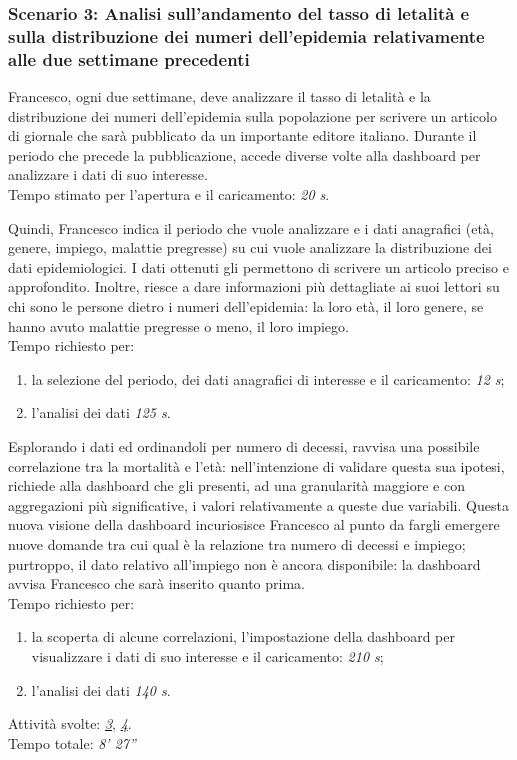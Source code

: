 \subsubsection*{Scenario 3: Analisi sull'andamento del tasso di letalità e sulla distribuzione dei numeri dell'epidemia relativamente alle due settimane precedenti}
Francesco, ogni due settimane, deve analizzare il tasso di letalità e la distribuzione dei numeri dell’epidemia sulla popolazione per scrivere un articolo di giornale che sarà pubblicato da un importante editore italiano. Durante il periodo che precede la pubblicazione, accede diverse volte alla dashboard per analizzare i dati di suo interesse.\\
Tempo stimato per l'apertura e il caricamento: \textit{20 s}. 

Quindi, Francesco indica il periodo che vuole analizzare e i dati anagrafici (età, genere, impiego, malattie pregresse) su cui vuole analizzare la distribuzione dei dati epidemiologici.
I dati ottenuti gli permettono di scrivere un articolo preciso e approfondito. Inoltre, riesce a dare informazioni più dettagliate ai suoi lettori su chi sono le persone dietro i numeri dell'epidemia: la loro età, il loro genere, se hanno avuto malattie pregresse o meno, il loro impiego.\\
Tempo richiesto per:
\begin{enumerate}
    \item la selezione del periodo, dei dati anagrafici di interesse e il caricamento: \textit{12 s};
    \item l'analisi dei dati \textit{125 s}.
\end{enumerate}

Esplorando i dati ed ordinandoli per numero di decessi, ravvisa una possibile correlazione tra la mortalità e l'età: nell'intenzione di validare questa sua ipotesi, richiede alla dashboard che gli presenti, ad una granularità maggiore e con aggregazioni più significative, i valori relativamente a queste due variabili. 
Questa nuova visione della dashboard incuriosisce Francesco al punto da fargli emergere nuove domande tra cui qual è la relazione tra numero di decessi e impiego; purtroppo, il dato relativo all'impiego non è ancora disponibile: la dashboard avvisa Francesco che sarà inserito quanto prima.\\
Tempo richiesto per:
\begin{enumerate}
    \item la scoperta di alcune correlazioni, l'impostazione della dashboard per visualizzare i dati di suo interesse e il caricamento: \textit{210 s};
    \item l'analisi dei dati \textit{140 s}.
\end{enumerate}
\noindent
Attività svolte: \hyperref[itm:3]{\textit{3}}, \hyperref[itm:4]{\textit{4}}.\\ 
Tempo totale: \textit{8' 27''} 

